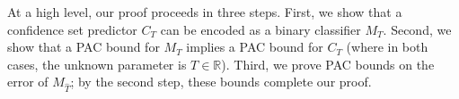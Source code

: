 \documentclass{article} \usepackage{iclr2020_conference,times}
\renewcommand{\(}						{\left(}
\renewcommand{\)}						{\right)}
\renewcommand{\[}						{\left[}
\renewcommand{\]}						{\right]}
\newcommand{\<}						{\left<}
\renewcommand{\>}						{\right>}
\begin{document}
\begin{comment}
\paragraph{Generalization bound.}

Let $T^*$ be the smallest $T$ for which $\tilde{L}(M_T)=\epsilon$, and 
recall $\hat{T}$ be the solution of (\ref{eqn:algorithm}), where $\tilde{L}(M_{\hat{T}}) = L(C_{\hat{T}})$.

Since 
$\hat{T} < T^*$ implies that $\tilde{L}(M_{\hat{T}}) > \tilde{L}(M_{T^*})=\epsilon$, and vice versa, 
(\ref{eqn:gebproof1}) is equivalently
\begin{align*}
\mathbb{P}_{\tilde{Z}_{\text{val}}\sim\tilde{D}^n}\left[\hat{T}<T^*\right]\le\delta_0.
\end{align*}
\footnote{We implicitly assume that the distribution $\tilde{D}$ is continuous, but this assumption is very mild.}

Consider the event $\hat{T}<T^*$; recalling that $\hat{T}$ must satisfy $\hat{L}(C_{\hat{T}};Z_{\text{val}})\le\alpha$, so on this event, we have
\begin{align*}
k\ge\sum_{(t,a)\in\tilde{Z}_{\text{val}}}\mathbb{I}[M_{\hat{T}}(t)\neq a]=\sum_{(t,a)\in\tilde{Z}_{\text{val}}}\mathbb{I}[t>\hat{T}]\ge\sum_{(t,a)\in\tilde{Z}_{\text{val}}}\mathbb{I}[t>T^*]
\end{align*}
where $k=n\cdot\alpha(n,\epsilon,\delta)$. Thus, we have
\begin{align*}
\mathbb{P}_{\tilde{Z}_{\text{val}}\sim\tilde{D}^n}\left[\hat{T}<T^*\right]
&\le\mathbb{P}_{\tilde{Z}_{\text{val}}\sim\tilde{D}^n}\left[\sum_{(t,a)\in\tilde{Z}_{\text{val}}}\mathbb{I}[t>T^*]\le k\right].
\end{align*}
The event in the right-hand side of this inequality is essentially the sum of $n$ i.i.d. random variables $\mathbb{I}[t>T^*]\sim\text{Bernoulli}(\epsilon)$. Thus, this event follows a distribution $\text{Binomial}(n,\epsilon)$, so
\begin{align*}
\mathbb{P}_{\tilde{Z}_{\text{val}}\sim\tilde{D}^n}\left[\hat{T}<T^*\right]
\le\sum_{i=0}^k\text{Binomial}(i;n,\epsilon)=\sum_{i=0}^k{n\choose i}\epsilon^i(1-\epsilon)^{n-i}
=\delta_0,
\end{align*}
as claimed. $\blacksquare$
\end{comment}

At a high level, our proof proceeds in three steps. First, we show that a confidence set predictor $C_T$ can be encoded as a binary classifier $M_T$. Second, we show that a PAC bound for $M_T$ implies a PAC bound for $C_T$ (where in both cases, the unknown parameter is $T\in\mathbb{R}$). Third, we prove PAC bounds on the error of $M_{\hat T}$; by the second step, these bounds complete our proof.
\end{document}
